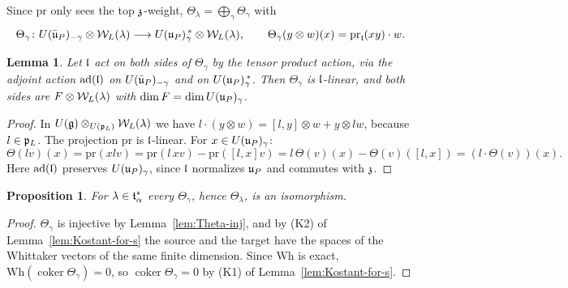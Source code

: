 \documentclass{article}
\theoremstyle{plain}
\newtheorem{proposition}[theorem]{Proposition}
\newtheorem{lemma}[theorem]{Lemma}
\theoremstyle{definition}
\theoremstyle{remark}
\numberwithin{equation}{section}
\begin{document}
Since $\mathrm{pr}$ only sees the top $\mathfrak{z}$-weight, $\Theta_\lambda=\bigoplus_{\gamma}\Theta_\gamma$ with
\[
\Theta_\gamma\colon U(\bar{\mathfrak{u}}_P)_{-\gamma}\otimes\mathcal{W}_L(\lambda)\longrightarrow U(\mathfrak{u}_P)_\gamma^{\,*}\otimes\mathcal{W}_L(\lambda),\qquad
\Theta_\gamma(y\otimes w)(x)=\mathrm{pr}_{\mathfrak{l}}(xy)\cdot w .
\]

\begin{lemma}\label{lem:Theta-l-linear}
Let $\mathfrak{l}$ act on both sides of $\Theta_\gamma$ by the tensor product action, via the adjoint action $\operatorname{ad}(\mathfrak{l})$ on $U(\bar{\mathfrak{u}}_P)_{-\gamma}$ and on $U(\mathfrak{u}_P)^{\,*}_\gamma$. Then $\Theta_\gamma$ is $\mathfrak{l}$-linear, and both sides are $F\otimes\mathcal{W}_L(\lambda)$ with $\dim F=\dim U(\mathfrak{u}_P)_{\gamma}$.
\end{lemma}

\begin{proof}
In $U(\mathfrak{g})\otimes_{U(\mathfrak{p}_L)}\mathcal{W}_L(\lambda)$ we have $l\cdot(y\otimes w)=[l,y]\otimes w+y\otimes lw$, because $l\in\mathfrak{p}_L$. The projection $\mathrm{pr}$ is $\mathfrak{l}$-linear. For $x\in U(\mathfrak{u}_P)_\gamma$:
\[
\Theta(lv)(x)=\mathrm{pr}(xlv)=\mathrm{pr}(l\,xv)-\mathrm{pr}([l,x]v)=l\,\Theta(v)(x)-\Theta(v)([l,x])=(l\cdot\Theta(v))(x).
\]
Here $\operatorname{ad}(\mathfrak{l})$ preserves $U(\mathfrak{u}_P)_\gamma$, since $\mathfrak{l}$ normalizes $\mathfrak{u}_P$ and commutes with $\mathfrak{z}$.
\end{proof}

\begin{proposition}\label{prop:Theta-gamma-iso}
For $\lambda\in\mathfrak{t}^*_\alpha$ every $\Theta_\gamma$, hence $\Theta_\lambda$, is an isomorphism.
\end{proposition}

\begin{proof}
$\Theta_\gamma$ is injective by Lemma~\ref{lem:Theta-inj}, and by (K2) of Lemma~\ref{lem:Kostant-for-s} the source and the target have the spaces of the Whittaker vectors of the same finite dimension. Since $\mathrm{Wh}$ is exact, $\mathrm{Wh}(\operatorname{coker}\Theta_\gamma)=0$, so $\operatorname{coker}\Theta_\gamma=0$ by (K1) of Lemma~\ref{lem:Kostant-for-s}.
\end{proof}
\end{document}
